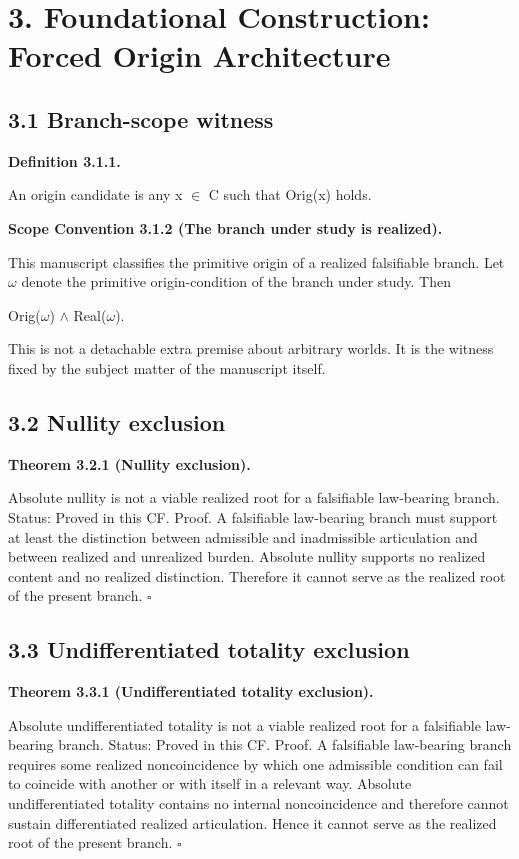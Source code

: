 \documentclass[11pt]{article}
\begin{document}
\section{3. Foundational Construction: Forced Origin Architecture}\label{foundational-construction-forced-origin-architecture}

\subsection{3.1 Branch-scope witness}\label{branch-scope-witness}

\textbf{Definition 3.1.1.}

An origin candidate is any x $\in$ C such that Orig(x) holds.

\textbf{Scope Convention 3.1.2 (The branch under study is realized).}

This manuscript classifies the primitive origin of a realized falsifiable branch. Let $\omega$ denote the primitive origin-condition of the branch under study. Then

Orig($\omega$) $\wedge$ Real($\omega$).

This is not a detachable extra premise about arbitrary worlds. It is the witness fixed by the subject matter of the manuscript itself.

\subsection{3.2 Nullity exclusion}\label{nullity-exclusion}

\textbf{Theorem 3.2.1 (Nullity exclusion).}

Absolute nullity is not a viable realized root for a falsifiable law-bearing branch. Status: Proved in this CF. Proof. A falsifiable law-bearing branch must support at least the distinction between admissible and inadmissible articulation and between realized and unrealized burden. Absolute nullity supports no realized content and no realized distinction. Therefore it cannot serve as the realized root of the present branch. $\square$

\subsection{3.3 Undifferentiated totality exclusion}\label{undifferentiated-totality-exclusion}

\textbf{Theorem 3.3.1 (Undifferentiated totality exclusion).}

Absolute undifferentiated totality is not a viable realized root for a falsifiable law-bearing branch. Status: Proved in this CF. Proof. A falsifiable law-bearing branch requires some realized noncoincidence by which one admissible condition can fail to coincide with another or with itself in a relevant way. Absolute undifferentiated totality contains no internal noncoincidence and therefore cannot sustain differentiated realized articulation. Hence it cannot serve as the realized root of the present branch. $\square$
\end{document}

